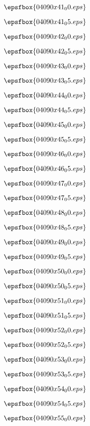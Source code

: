 \vfil \eject
$$\epsfbox{04090x41_00.eps}$$ 

\vfil \eject
$$\epsfbox{04090x41_05.eps}$$ 

\vfil \eject
$$\epsfbox{04090x42_00.eps}$$ 

\vfil \eject
$$\epsfbox{04090x42_05.eps}$$ 

\vfil \eject
$$\epsfbox{04090x43_00.eps}$$ 

\vfil \eject
$$\epsfbox{04090x43_05.eps}$$ 

\vfil \eject
$$\epsfbox{04090x44_00.eps}$$ 

\vfil \eject
$$\epsfbox{04090x44_05.eps}$$ 

\vfil \eject
$$\epsfbox{04090x45_00.eps}$$ 

\vfil \eject
$$\epsfbox{04090x45_05.eps}$$ 

\vfil \eject
$$\epsfbox{04090x46_00.eps}$$ %

\vfil \eject
$$\epsfbox{04090x46_05.eps}$$ 


\vfil \eject
$$\epsfbox{04090x47_00.eps}$$ 

\vfil \eject
$$\epsfbox{04090x47_05.eps}$$ 

\vfil \eject
$$\epsfbox{04090x48_00.eps}$$ 

\vfil \eject
$$\epsfbox{04090x48_05.eps}$$ 

\vfil \eject
$$\epsfbox{04090x49_00.eps}$$ 

\vfil \eject
$$\epsfbox{04090x49_05.eps}$$ 

\vfil \eject
$$\epsfbox{04090x50_00.eps}$$ 

\vfil \eject
$$\epsfbox{04090x50_05.eps}$$ 

\vfil \eject
$$\epsfbox{04090x51_00.eps}$$ 

\vfil \eject
$$\epsfbox{04090x51_05.eps}$$ 

\vfil \eject
$$\epsfbox{04090x52_00.eps}$$ 

\vfil \eject
$$\epsfbox{04090x52_05.eps}$$ 

\vfil \eject
$$\epsfbox{04090x53_00.eps}$$ 

\vfil \eject
$$\epsfbox{04090x53_05.eps}$$ 

\vfil \eject
$$\epsfbox{04090x54_00.eps}$$ 

\vfil \eject
$$\epsfbox{04090x54_05.eps}$$ 

\vfil \eject
$$\epsfbox{04090x55_00.eps}$$ 

